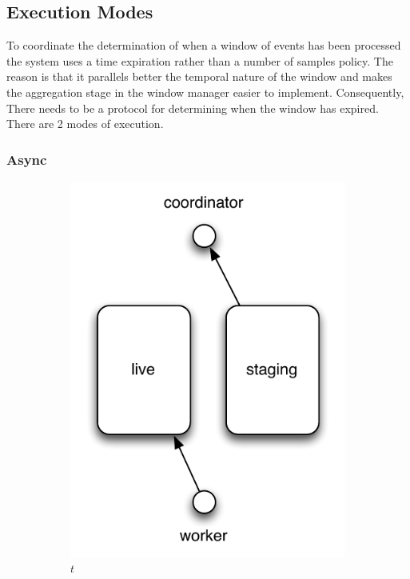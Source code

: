 \documentclass[a4paper,11pt]{scrreprt}
\begin{document}
\subsection{Execution Modes}
To coordinate the determination of when a window of events has been processed the system uses a time expiration rather than a number of samples policy. The reason is that it parallels better the temporal nature of the window and makes the aggregation stage in the window manager easier to implement. Consequently, There needs to be a protocol for determining when the window has expired. There are 2 modes of execution. 
\subsubsection{Async}
\begin{figure}[h!]
\centering
	\begin{subfigure}[t]{2 in}
		\centering
		\includegraphics[scale=0.7]{async-mode1.pdf}
		\caption{\(t\)}\label{fig:asyncmode.t}		
	\end{subfigure}
	\begin{subfigure}[t]{2 in}
		\centering

\end{subfigure}
\end{figure}
\end{document}
